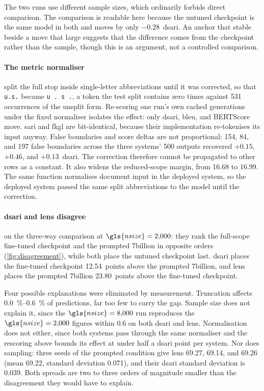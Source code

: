 The two runs use different sample sizes, which ordinarily forbids direct comparison.
The comparison is readable here because the untuned checkpoint is the same model in both and moves by only \(-0.28\)~\gls{dsari}.
An anchor that stable beside a move that large suggests that the difference comes from the checkpoint rather than the sample, though this is an argument, not a controlled comparison.

\paragraph{The metric normaliser} split the full stop inside single-letter abbreviations until it was corrected, so that \texttt{u.s.} became \texttt{u~.~s~.}, a token the test split contains zero times against \num{531} occurrences of the unsplit form.
Re-scoring one run's own cached generations under the fixed normaliser isolates the effect: only \gls{dsari}, \gls{bleu}, and BERTScore move.
\Gls{sari} and \gls{fkgl} are bit-identical, because their implementation re-tokenises its input anyway.
False boundaries and score deltas are not proportional: \num{154}, 84, and \num{197} false boundaries across the three systems' \num{500} outputs recovered \(+0.15\), \(+0.46\), and \(+0.13\)~\gls{dsari}.
The correction therefore cannot be propagated to other rows as a constant.
It also widens the reduced-scope margin, from \num{16.68} to \num{16.99}.
The same function normalises document input in the deployed system, so the deployed system passed the same split abbreviations to the model until the correction.

\paragraph{\Gls{dsari} and \gls{lens} disagree} on the three-way comparison at \(\gls{nsize} = 2{,}000\): they rank the full-scope fine-tuned checkpoint and the prompted 7\gls{billion} in opposite orders (\cref{fig:disagreement}), while both place the untuned checkpoint last.
\Gls{dsari} places the fine-tuned checkpoint \num{12.54}~points above the prompted 7\gls{billion}, and \gls{lens} places the prompted 7\gls{billion} \num{23.80}~points above the fine-tuned checkpoint.

Four possible explanations were eliminated by measurement.
Truncation affects \qtyrange{0.0}{0.6}{\percent} of predictions, far too few to carry the gap.
Sample size does not explain it, since the \(\gls{nsize} = 8{,}000\) run reproduces the \(\gls{nsize} = 2{,}000\) figures within \num{0.6} on both \gls{dsari} and \gls{lens}.
Normalisation does not either, since both systems pass through the same normaliser and the rescoring above bounds its effect at under half a \gls{dsari} point per system.
Nor does sampling: three seeds of the prompted condition give \gls{lens} \num{69.27}, \num{69.14}, and \num{69.26} (mean \num{69.22}, standard deviation \num{0.071}), and their \gls{dsari} standard deviation is \num{0.039}.
Both spreads are two to three orders of magnitude smaller than the disagreement they would have to explain.

